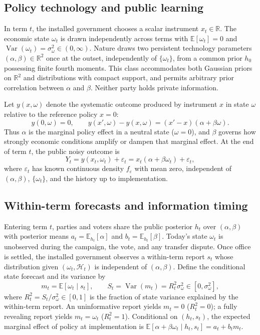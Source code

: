 \documentclass[11pt,letterpaper]{article}
\newcommand{\E}{\mathbb E}
\newcommand{\Var}{\operatorname{Var}}
\begin{document}
\subsection{Policy technology and public learning}

In term $t$, the installed government chooses a scalar instrument $x_t\in\mathbb R$. The economic state $\omega_t$ is drawn independently across terms with $\E[\omega_t]=0$ and $\Var(\omega_t)=\sigma_\omega^2\in(0,\infty)$. Nature draws two persistent technology parameters $(\alpha,\beta)\in\mathbb R^2$ once at the outset, independently of $\{\omega_t\}$, from a common prior $h_0$ possessing finite fourth moments. This class accommodates both Gaussian priors on $\mathbb R^2$ and distributions with compact support, and permits arbitrary prior correlation between $\alpha$ and $\beta$. Neither party holds private information.

Let $y(x,\omega)$ denote the systematic outcome produced by instrument $x$ in state $\omega$ relative to the reference policy $x=0$:
\[
 y(0,\omega)=0,\qquad
 y(x',\omega)-y(x,\omega)=(x'-x)(\alpha+\beta\omega).
\]
Thus $\alpha$ is the marginal policy effect in a neutral state ($\omega=0$), and $\beta$ governs how strongly economic conditions amplify or dampen that marginal effect. At the end of term $t$, the public noisy outcome is
\begin{equation}
 Y_t=y(x_t,\omega_t)+\varepsilon_t
    =x_t(\alpha+\beta\omega_t)+\varepsilon_t ,
 \label{eq:dgp}
\end{equation}
where $\varepsilon_t$ has known continuous density $f_\varepsilon$ with mean zero, independent of $(\alpha,\beta)$, $\{\omega_t\}$, and the history up to implementation.

\subsection{Within-term forecasts and information timing}

Entering term $t$, parties and voters share the public posterior $h_t$ over $(\alpha,\beta)$ with posterior means $a_t=\E_{h_t}[\alpha]$ and $b_t=\E_{h_t}[\beta]$. Today's state $\omega_t$ is unobserved during the campaign, the vote, and any transfer dispute. Once office is settled, the installed government observes a within-term report $s_t$ whose distribution given $(\omega_t,\mathcal H_t)$ is independent of $(\alpha,\beta)$. Define the conditional state forecast and its variance by
\begin{equation}
 m_t=\E[\omega_t\mid s_t],\qquad
 S_t=\Var(m_t)=R_t^2\sigma_\omega^2 \in[0,\sigma_\omega^2],
 \label{eq:monitoring}
\end{equation}
where $R_t^2=S_t/\sigma_\omega^2\in[0,1]$ is the fraction of state variance explained by the within-term report. An uninformative report yields $m_t=0$ ($R_t^2=0$); a fully revealing report yields $m_t=\omega_t$ ($R_t^2=1$). Conditional on $(h_t,s_t)$, the expected marginal effect of policy at implementation is $\E[\alpha+\beta\omega_t\mid h_t,s_t]=a_t+b_t m_t$.
\end{document}
